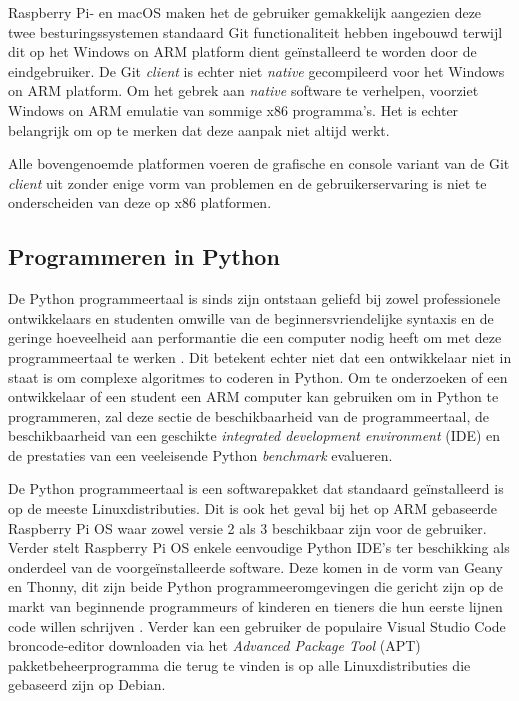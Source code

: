 Raspberry Pi- en macOS maken het de gebruiker gemakkelijk aangezien deze twee besturingssystemen standaard Git functionaliteit hebben ingebouwd terwijl dit op het Windows on ARM platform dient geïnstalleerd te worden door de eindgebruiker. De Git \textit{client} is echter niet \textit{native} gecompileerd voor het Windows on ARM platform. Om het gebrek aan \textit{native} software te verhelpen, voorziet Windows on ARM emulatie van sommige x86 programma’s. Het is echter belangrijk om op te merken dat deze aanpak niet altijd werkt. 

Alle bovengenoemde platformen voeren de grafische en console variant van de Git \textit{client} uit zonder enige vorm van problemen en de gebruikerservaring is niet te onderscheiden van deze op x86 platformen.

\subsection{Programmeren in Python}
De Python programmeertaal is sinds zijn ontstaan geliefd bij zowel professionele ontwikkelaars en studenten omwille van de beginnersvriendelijke syntaxis en de geringe hoeveelheid aan performantie die een computer nodig heeft om met deze programmeertaal te werken \autocite{StackOverflow2020}. Dit betekent echter niet dat een ontwikkelaar niet in staat is om complexe algoritmes to coderen in Python. Om te onderzoeken of een ontwikkelaar of een student een ARM computer kan gebruiken om in Python te programmeren, zal deze sectie de beschikbaarheid van de programmeertaal, de beschikbaarheid van een geschikte \textit{integrated development environment} (IDE) en de prestaties van een veeleisende Python \textit{benchmark} evalueren.

De Python programmeertaal is een softwarepakket dat standaard geïnstalleerd is op de meeste Linuxdistributies. Dit is ook het geval bij het op ARM gebaseerde Raspberry Pi OS waar zowel versie 2 als 3 beschikbaar zijn voor de gebruiker. Verder stelt Raspberry Pi OS enkele eenvoudige Python IDE’s ter beschikking als onderdeel van de voorgeïnstalleerde software. Deze komen in de vorm van Geany en Thonny, dit zijn beide Python programmeeromgevingen die gericht zijn op de markt van beginnende programmeurs of kinderen en tieners die hun eerste lijnen code willen schrijven \autocite{Fromaget2021}. Verder kan een gebruiker de populaire Visual Studio Code broncode-editor downloaden via het \textit{Advanced Package Tool} (APT) pakketbeheerprogramma die terug te vinden is op alle Linuxdistributies die gebaseerd zijn op Debian.

